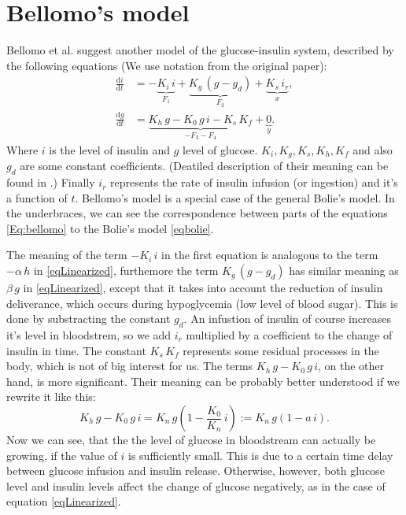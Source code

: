 \documentclass{article}
\providecommand{\m}[1]{\ensuremath{\mathrm{#1}}}
\begin{document}
\section{Bellomo's model}
Bellomo et al. \cite{bellomo} suggest another model of the glucose-insulin system, described by the following equations
(We use notation from the original paper):
\begin{equation}
\label{Eq:bellomo}
\begin{aligned}
 \frac{\m{d}i}{\m{d}t} &= -\underbrace{K_i\,i}_{F_1} + \underbrace{K_g\,(g - g_d)}_{F_2} + \underbrace{K_s\,i_r}_{x}, \\
 \frac{\m{d}g}{\m{d}t} &= \underbrace{K_h\,g - K_0\,g\,i - K_s\,K_f}_{-F_3-F_4} + \underbrace{0}_{y}.
\end{aligned}
\end{equation}
Where $i$ is the level of insulin and $g$ level of glucose.
$K_i, K_g, K_s, K_h, K_f$ and also $g_d$ are some constant coefficients.
(Deatiled description of their meaning can be found in \cite{bellomo}.)
Finally $i_r$ represents the rate of insulin infusion (or ingestion) and it's a function of $t$.
Bellomo's model is a special case of the general Bolie's model.
In the underbraces, we can see the correspondence between parts of the equations \eqref{Eq:bellomo} to the Bolie's model \eqref{eqbolie}.

The meaning of the term $-K_i\,i$ in the first equation is analogous to the term $-\alpha\,h$ in \eqref{eqLinearized},
furthemore the term $K_g\,(g - g_d)$ has similar meaning as $\beta\,g$ in \eqref{eqLinearized},
except that it takes into account the reduction of insulin deliverance, which occurs during hypoglycemia 
(low level of blood sugar). This is done by substracting the constant $g_d$.
An infustion of insulin of course increases it's level in bloodstrem, so we add $i_r$ multiplied by a coefficient
to the change of insulin in time. The constant $K_s\,K_f$ represents some residual processes in the body,
which is not of big interest for us. The terms $K_h\,g - K_0\,g\,i$, on the other hand,
is more significant. Their meaning can be probably better understood if we rewrite it like this:
\[ K_h\,g - K_0\,g\,i = K_n\,g(1 - \frac{K_0}{K_n}\,i) := K_n\,g(1 - a\,i). \]
Now we can see, that the the level of glucose in bloodstream can actually be growing, if
the value of $i$ is sufficiently small.
This is due to a certain time delay between glucose infusion and insulin release.
Otherwise, however, both glucose level and insulin levels affect the change of glucose negatively,
as in the case of equation \eqref{eqLinearized}.
\end{document}
